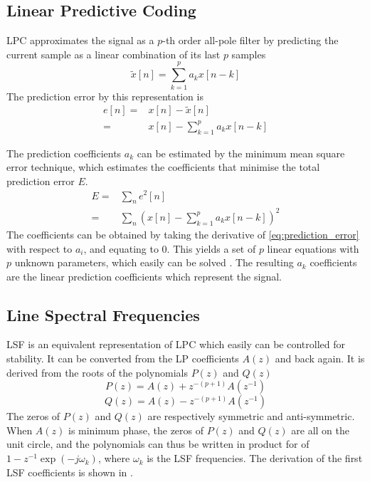 \subsection{Linear Predictive Coding} %
\label{sub:lpc}
LPC approximates the signal as a $p$-th order all-pole filter by predicting the current sample as a linear combination of its last $p$ samples \cite{digsig}
\begin{equation}
	\tilde{x}[n] = \sum_{k=1}^{p}a_k x[n-k]
\end{equation}
The prediction error by this representation is 
\begin{equation}
	\begin{split}
		e[n]= & x[n]-\tilde{x}[n]\\
		= & x[n]-\sum_{k=1}^{p}a_k x[n-k]
	\end{split}
\end{equation}

The prediction coefficients $a_k$ can be estimated by the minimum mean square error technique, which estimates the coefficients that minimise the total prediction error $E$.
\begin{equation}
	\label{eq:prediction_error}
	\begin{split}
		E = & \sum_{n}e^2[n]\\
		= & \sum_{n}\left( x[n]-\sum_{k=1}^{p}a_k x[n-k] \right)^2
	\end{split}
\end{equation}
The coefficients can be obtained by taking the derivative of \eqref{eq:prediction_error} with respect to $a_i$, and equating to 0. This yields a set of $p$ linear equations with $p$ unknown parameters, which easily can be solved \cite{digsig}. The resulting $a_k$ coefficients are the linear prediction coefficients which represent the signal.

\subsection{Line Spectral Frequencies} %
\label{sub:line_spectral_frequencies}
LSF is an equivalent representation of LPC which easily can be controlled for stability. It can be converted from the LP coefficients $A(z)$ and back again. It is derived from the roots of the polynomials $P(z)$ and $Q(z)$ 
\begin{equation}
	\label{eq:p_z}
	P(z) = A(z)+z^{-(p+1)}A(z^{-1})
\end{equation}
\begin{equation}
	\label{eq:q_z}
	Q(z) = A(z)-z^{-(p+1)}A(z^{-1})
\end{equation}
The zeros of $P(z)$ and $Q(z)$ are respectively symmetric and anti-symmetric. When $A(z)$ is minimum phase, the zeros of $P(z)$ and $Q(z)$ are all on the unit circle, and the polynomials can thus be written in product for of
$1-z^{-1}\exp(-j\omega_k)$, where $\omega_k$ is the LSF frequencies. The derivation of the first LSF coefficients is shown in \cite[p. 304]{taletek}.

